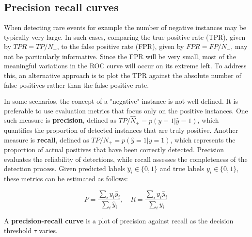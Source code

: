 \documentclass[12pt, a4paper]{article}
\theoremstyle{definition}
\numberwithin{figure}{section}
\numberwithin{equation}{section}
\numberwithin{table}{section}
\begin{document}
\subsection{Precision recall curves}

When detecting rare events for example the number of negative instances may be typically very large. In such cases, comparing the true positive rate (TPR), given by $TPR = TP / N_+$, to the false positive rate (FPR), given by $FPR = FP / N_-$, may not be particularly informative. Since the FPR will be very small, most of the meaningful variations in the ROC curve will occur on its extreme left. To address this, an alternative approach is to plot the TPR against the absolute number of false positives rather than the false positive rate.

In some scenarios, the concept of a "negative" instance is not well-defined.
It is preferable to use evaluation metrics that focus only on the positive instances.
One such measure is \textbf{precision}, defined as $TP / \hat{N}_+ = p(y = 1 | \hat{y} = 1)$, which quantifies the proportion of detected instances that are truly positive. Another measure is \textbf{recall}, defined as $TP / N_+ = p(\hat{y} = 1 | y = 1)$, which represents the proportion of actual positives that have been correctly detected. Precision evaluates the reliability of detections, while recall assesses the completeness of the detection process. Given predicted labels $\hat{y}_i \in \{0,1\}$ and true labels $y_i \in \{0,1\}$, these metrics can be estimated as follows:

\begin{equation}
    P = \frac{\sum_i y_i \hat{y}_i}{\sum_i \hat{y}_i}, \quad R = \frac{\sum_i y_i \hat{y}_i}{\sum_i y_i}
     \label{eq:precision-recall-eq}
\end{equation}

A \textbf{precision-recall curve} is a plot of precision against recall as the decision threshold $\tau$ varies.
\end{document}
